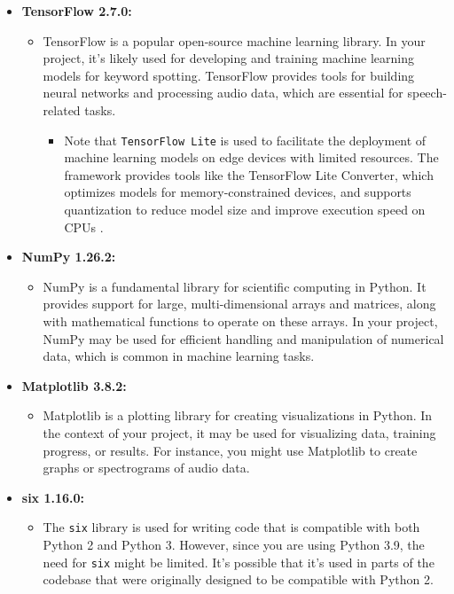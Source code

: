 \begin{enumerate}
\begin{itemize}
		\item \textbf{TensorFlow 2.7.0:}
		\begin{itemize}
			\item TensorFlow is a popular open-source machine learning library. In your project, it's likely used for developing and training machine learning models for keyword spotting. TensorFlow provides tools for building neural networks and processing audio data, which are essential for speech-related tasks.
			\begin{itemize}
				\item Note that \texttt{TensorFlow Lite} is used to facilitate the deployment of machine learning models on edge devices with limited resources. The framework provides tools like the TensorFlow Lite Converter, which optimizes models for memory-constrained devices, and supports quantization to reduce model size and improve execution speed on CPUs \cite{Goldsborough:2016}.
			\end{itemize}
		\end{itemize}
		
		\item \textbf{NumPy 1.26.2:}
		\begin{itemize}
			\item NumPy is a fundamental library for scientific computing in Python. It provides support for large, multi-dimensional arrays and matrices, along with mathematical functions to operate on these arrays. In your project, NumPy may be used for efficient handling and manipulation of numerical data, which is common in machine learning tasks.
		\end{itemize}
		
		\item \textbf{Matplotlib 3.8.2:}
		\begin{itemize}
			\item Matplotlib is a plotting library for creating visualizations in Python. In the context of your project, it may be used for visualizing data, training progress, or results. For instance, you might use Matplotlib to create graphs or spectrograms of audio data.
		\end{itemize}
		
		\item \textbf{six 1.16.0:}
		\begin{itemize}
			\item The \texttt{six} library is used for writing code that is compatible with both Python 2 and Python 3. However, since you are using Python 3.9, the need for \texttt{six} might be limited. It's possible that it's used in parts of the codebase that were originally designed to be compatible with Python 2.
		\end{itemize}
		

\end{itemize}
\end{enumerate}
